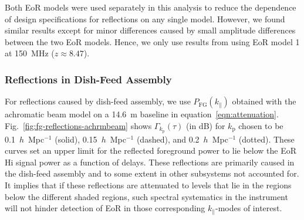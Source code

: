 \documentclass[preprint2,iop,numberedappendix,twocolappendix,appendixfloats]{emulateapj}
\begin{document}
Both EoR models were used separately in this analysis to reduce the dependence of design specifications for reflections on any single model. However, we found similar results except for minor differences caused by small amplitude differences between the two EoR models. Hence, we only use results from using EoR model 1 at 150~MHz ($z\approx 8.47$).

\subsubsection{Reflections in Dish-Feed Assembly}\label{sec:dish-feed-reflections}

For reflections caused by dish-feed assembly, we use $P_\textrm{FG}(k_\parallel)$ obtained with the achromatic beam model on a 14.6~m baseline in equation~\ref{eqn:attenuation}. Fig.~\ref{fig:fg-reflections-achrmbeam} shows $\Gamma_{k_\textrm{p}}(\tau)$ (in dB) for $k_\textrm{p}$ chosen to be 0.1~$h$~Mpc$^{-1}$ (solid), 0.15~$h$~Mpc$^{-1}$ (dashed), and 0.2~$h$~Mpc$^{-1}$ (dotted). These curves set an upper limit for the reflected foreground power to lie below the EoR H{\sc i} signal power as a function of delays. These reflections are primarily caused in the dish-feed assembly and to some extent in other subsystems not accounted for. It implies that if these reflections are attenuated to levels that lie in the regions below the different shaded regions, such spectral systematics in the instrument will not hinder detection of EoR in those corresponding $k_\parallel$-modes of interest. 
\end{document}
